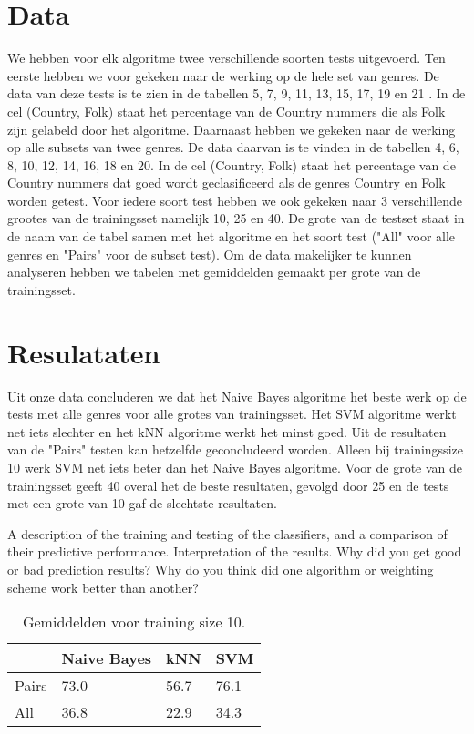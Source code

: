 \documentclass[a4paper,oneside]{article}
\begin{document}
\section{Data}
We hebben voor elk algoritme twee verschillende soorten tests uitgevoerd. Ten eerste hebben we voor gekeken naar de werking op de hele set van genres. De data van deze tests is te zien in de tabellen 5, 7, 9, 11, 13, 15, 17, 19 en 21 . In de cel (Country, Folk) staat het percentage van de Country nummers die als Folk zijn gelabeld door het algoritme. Daarnaast hebben we gekeken naar de werking  op alle subsets van twee genres. De data daarvan is te vinden in de tabellen 4, 6, 8, 10, 12, 14, 16, 18 en 20. In de cel (Country, Folk) staat het percentage van de Country nummers dat goed wordt geclasificeerd als de genres Country en Folk worden getest. Voor iedere soort test hebben we ook gekeken naar 3 verschillende grootes van de trainingsset namelijk 10, 25 en 40. De grote van de testset staat in de naam van de tabel samen met het algoritme en het soort test ("All" voor alle genres en "Pairs" voor de subset test). Om de data makelijker te kunnen analyseren hebben we tabelen met gemiddelden gemaakt per grote van de trainingsset.

\section{Resulataten}
Uit onze data concluderen we dat het Naive Bayes algoritme het beste werk op de tests met alle genres voor alle grotes van trainingsset. Het SVM algoritme werkt net iets slechter en het kNN algoritme werkt het minst goed. Uit de resultaten van de "Pairs" testen kan hetzelfde geconcludeerd worden. Alleen bij trainingssize 10 werk SVM net iets beter dan het Naive Bayes algoritme. Voor de grote van de trainingsset geeft 40 overal het de beste  resultaten, gevolgd door 25 en de tests met een grote van 10 gaf de slechtste resultaten. 

A description of the training and testing of the classifiers, and a comparison of their predictive performance.
Interpretation of the results. Why did you get good or bad prediction results? Why do you think did one algorithm or weighting scheme work better than another?

\begin{table}[H]\centering
\caption{Gemiddelden voor training size 10.}
\begin{tabu}{l|l|l|l}
& Naive Bayes & kNN & SVM \\ \hline
Pairs & 73.0 & 56.7 & 76.1 \\
All & 36.8 & 22.9 & 34.3 \\
\end{tabu}
\end{table}
\end{document}
